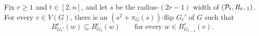 \begin{lemma}\label{lem:strategy-poly}
Fix \(r\ge 1\) and \(t\in[2,n]\), and let \(s\) be the radius-\((2r-1)\)
width of \((\cal P_t,R_{t-1})\). For every \(v\in V(G)\), there is an
\((s^2+\pi_G(s))\)-flip \(G_t'\) of \(G\) such that
\[
   B^r_{G_t'}(w)\subseteq B^r_{G_t}(w)
   \qquad\text{for every }w\in B^r_{G_{t-1}}(v).
\]
\end{lemma}

